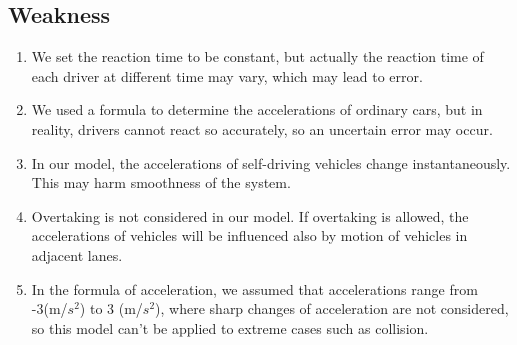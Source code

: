 \documentclass{icmmcm}
\begin{document}
\subsection{Weakness}
\begin{enumerate}
\item We set the reaction time to be constant, but actually the reaction time of each driver at different time may vary, which may lead to error.
\item We used a formula to determine the accelerations of ordinary cars, but in reality, drivers cannot react so accurately, so an uncertain error may occur.
\item In our model, the accelerations of self-driving vehicles change instantaneously. This may harm smoothness of the system.
\item Overtaking is not considered in our model. If overtaking is allowed, the accelerations of vehicles will be influenced also by motion of vehicles in adjacent lanes.
\item In the formula of acceleration, we assumed that accelerations range from -3(m/$s^{2}$) to 3 (m/$s^{2}$), where sharp changes of acceleration are not considered, so this model can't be applied to extreme cases such as collision.
\end{enumerate}







\end{document}
